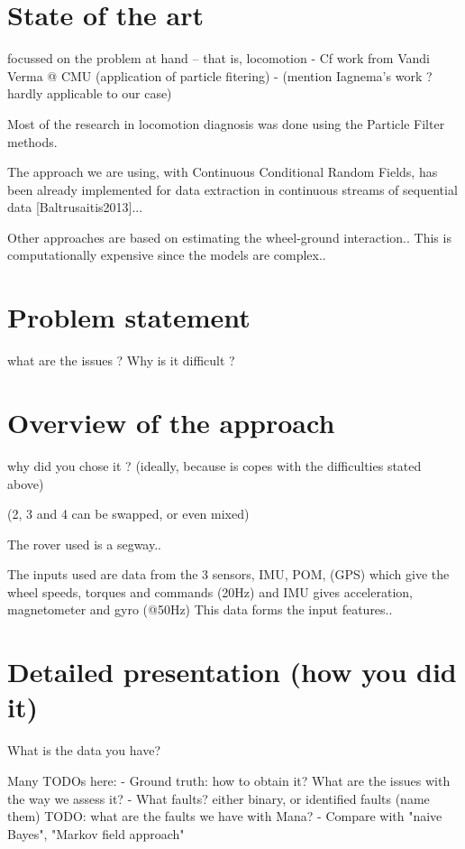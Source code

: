 \documentclass[a4paper, 10pt, conference]{ieeeconf}
\begin{document}
\section{State of the art}
\begin{itshape}focussed on the problem at hand -- that is, locomotion
- Cf work from Vandi Verma @ CMU (application of particle fitering)
- (mention Iagnema's work ? hardly applicable to our case)
\end{itshape}

Most of the research in locomotion diagnosis was done using the Particle Filter methods.

The approach we are using, with Continuous Conditional Random Fields, has been already implemented for data extraction in continuous streams of sequential data [Baltrusaitis2013]...

Other approaches are based on estimating the wheel-ground interaction.. This is computationally expensive since the models are complex..

\section{Problem statement}
\begin{itshape}what are the issues ? Why is it difficult ?
\end{itshape}



\section{Overview of the approach}
\begin{itshape}why did you chose it ? (ideally, because is copes with the difficulties stated above)

(2, 3 and 4 can be swapped, or even mixed)
\end{itshape}

The rover used is a segway..

The inputs used are data from the 3 sensors, IMU, POM, (GPS) which give the wheel speeds, torques and commands (20Hz) and IMU gives acceleration, magnetometer and gyro (@50Hz)
This data forms the input features..

\section{Detailed presentation (how you did it)}
\begin{itshape}What is the data you have?

Many TODOs here:
- Ground truth: how to obtain it? What are the issues with the way we assess it?
- What faults? either binary, or identified faults (name them) TODO: what are
the faults we have with Mana?
- Compare with "naive Bayes", "Markov field approach"
\end{itshape}
\end{document}

